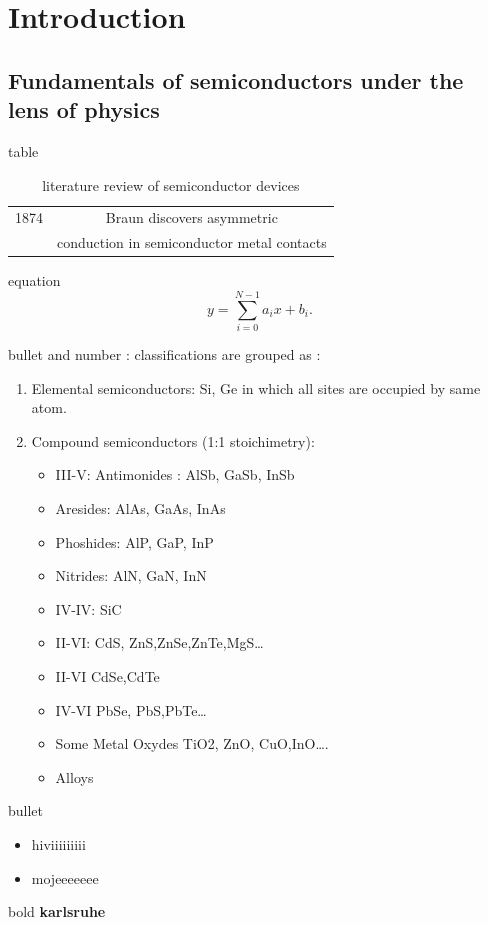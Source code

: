 \chapter{Introduction}
\label{introduction}
\section{	Fundamentals of semiconductors under the lens of physics }

table 
\begin{table}[h]
\centering
\caption{literature review of semiconductor devices }
\begin{tabular}{|c|c|}
\hline
1874 & Braun discovers asymmetric\\ &conduction in semiconductor metal contacts\\
\end{tabular}
\label{tab:1}
\end{table}
equation
\begin{equation}
\label{eq:1}
    y = \sum_{i=0}^{N-1}a_ix + b_i.
\end{equation}


bullet and number :
classifications are grouped as :
\begin{enumerate}
    \item Elemental semiconductors: Si, Ge in which all sites are occupied by same atom.
    \item Compound semiconductors (1:1 stoichimetry):
    \begin{itemize}
    \item III-V: Antimonides : AlSb, GaSb, InSb
    \item Aresides: AlAs, GaAs, InAs
    \item Phoshides: AlP, GaP, InP
    \item Nitrides: AlN, GaN, InN
    \item IV-IV: SiC
    \item II-VI: CdS, ZnS,ZnSe,ZnTe,MgS…
    \item II-VI CdSe,CdTe
    \item IV-VI PbSe, PbS,PbTe…
    \item Some Metal Oxydes TiO2, ZnO, CuO,InO….
\item Alloys 
    
\end{itemize}
\end{enumerate}

bullet
\begin{itemize}
    \item hiviiiiiiiii
    \item mojeeeeeee
\end{itemize}
bold
\textbf{karlsruhe}

